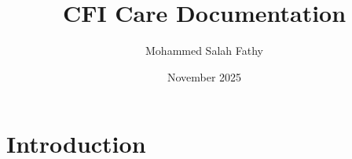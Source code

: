 \documentclass{article}
\title{CFI Care Documentation}
\author{Mohammed Salah Fathy}
\date{November 2025}
\begin{document}
\maketitle

\section{Introduction}
\end{document}

